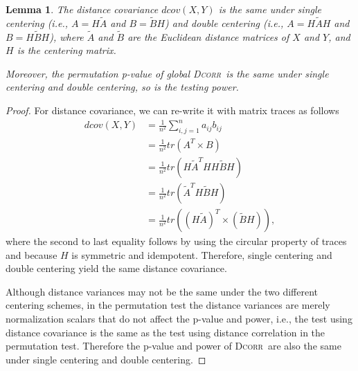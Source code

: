 \documentclass[11pt]{article}
\providecommand{\sct}[1]{{\normalfont\textsc{#1}}}
\newcommand{\Dcorr}{\sct{Dcorr}}
\newtheorem{appLem}{Lemma}
\begin{document}
\begin{appLem}
\label{lem1}
The distance covariance $dcov(X,Y)$ is the same under single centering (i.e., $A=H\tilde{A}$ and $B=\tilde{B}H$) and double centering (i.e., $A=H\tilde{A}H$ and $B=H\tilde{B}H$), where $\tilde{A}$ and $\tilde{B}$ are the Euclidean distance matrices of $X$ and $Y$, and $H$ is the centering matrix. 

Moreover, the permutation p-value of global \Dcorr~is the same under single centering and double centering, so is the testing power.
\end{appLem}
\begin{proof}
For distance covariance, we can re-write it with matrix traces as follows
\begin{align*}
dcov(X,Y) &= \frac{1}{n^2}\sum_{i,j=1}^{n}a_{ij}b_{ij} \\
 &=\frac{1}{n^2} tr(A^{T} \times B) \\
 &=\frac{1}{n^2} tr(H\tilde{A}^{T}HH\tilde{B}H) \\
 &=\frac{1}{n^2} tr(\tilde{A}^{T}H\tilde{B}H) \\
 &=\frac{1}{n^2} tr((H\tilde{A})^{T} \times (\tilde{B}H)),
\end{align*}
where the second to last equality follows by using the circular property of traces and because $H$ is symmetric and idempotent. Therefore, single centering and double centering yield the same distance covariance.

Although distance variances may not be the same under the two different centering schemes, in the permutation test the distance variances are merely normalization scalars that do not affect the p-value and power, i.e., the test using distance covariance is the same as the test using distance correlation in the permutation test. Therefore the p-value and power of \Dcorr~are also the same under single centering and double centering.
\end{proof}
\end{document}
